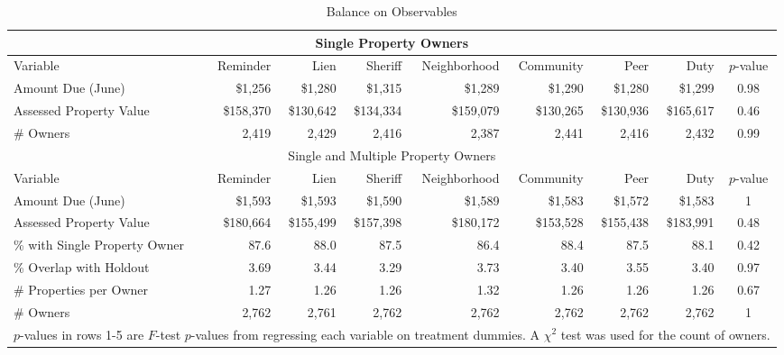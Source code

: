 \documentclass[12pt]{article}
\begin{document}
\begin{appendix}
\begin{sidewaystable}[htbp]
\centering
\caption{Balance on Observables}
\label{balance2}
\begin{tabular}{lrrrrrrrc}
\hline
\multicolumn{9}{c}{Single Property Owners} \\
  \hline
Variable & Reminder & Lien & Sheriff & Neighborhood & Community & Peer & Duty & $p$-value \\
   \hline
Amount Due (June) & \$1,256 & \$1,280 & \$1,315 & \$1,289 & \$1,290 & \$1,280 & \$1,299 & 0.98 \\
  Assessed Property Value & \$158,370 & \$130,642 & \$134,334 & \$159,079 & \$130,265 & \$130,936 & \$165,617 & 0.46 \\
  \# Owners & 2,419 & 2,429 & 2,416 & 2,387 & 2,441 & 2,416 & 2,432 & 0.99 \\
  \hline
\multicolumn{9}{c}{Single and Multiple Property Owners} \\
  \hline
Variable & Reminder & Lien & Sheriff & Neighborhood & Community & Peer & Duty & $p$-value \\
   \hline
Amount Due (June) & \$1,593 & \$1,593 & \$1,590 & \$1,589 & \$1,583 & \$1,572 & \$1,583 & 1 \\
  Assessed Property Value & \$180,664 & \$155,499 & \$157,398 & \$180,172 & \$153,528 & \$155,438 & \$183,991 & 0.48 \\
  \% with Single Property Owner & 87.6 & 88.0 & 87.5 & 86.4 & 88.4 & 87.5 & 88.1 & 0.42 \\
  \% Overlap with Holdout & 3.69 & 3.44 & 3.29 & 3.73 & 3.40 & 3.55 & 3.40 & 0.97 \\
  \# Properties per Owner & 1.27 & 1.26 & 1.26 & 1.32 & 1.26 & 1.26 & 1.26 & 0.67 \\
  \# Owners & 2,762 & 2,761 & 2,762 & 2,762 & 2,762 & 2,762 & 2,762 & 1 \\
  \hline
\multicolumn{9}{l}{\scriptsize{$p$-values in rows 1-5 are $F$-test $p$-values from regressing each variable on treatment dummies. A $\chi^2$ test was used for the count of owners.}} \\
\end{tabular}
\end{sidewaystable}



\end{appendix}
\end{document}
